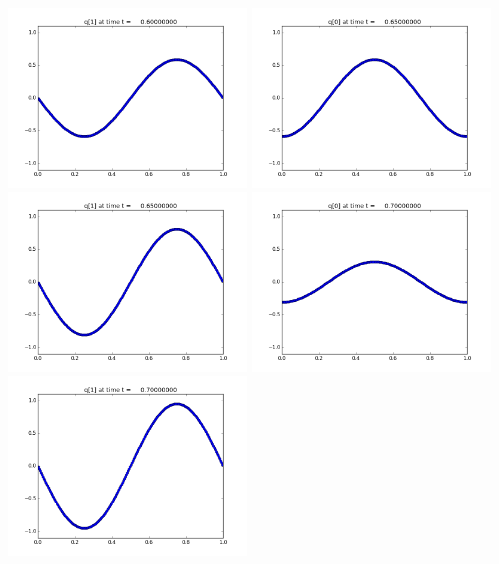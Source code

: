 \documentclass[11pt]{article}
\begin{document}
\includegraphics[width=0.475\textwidth]{frame0012fig1.png}
\vskip 10pt 
\includegraphics[width=0.475\textwidth]{frame0013fig0.png}
\includegraphics[width=0.475\textwidth]{frame0013fig1.png}
\vskip 10pt 
\includegraphics[width=0.475\textwidth]{frame0014fig0.png}
\includegraphics[width=0.475\textwidth]{frame0014fig1.png}
\end{document}
